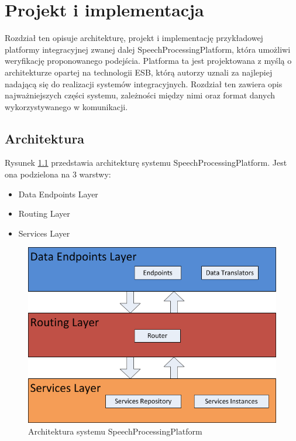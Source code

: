 
\chapter{Projekt i implementacja} %



\ifpdf
    \graphicspath{{6/figures/PNG/}{6/figures/PDF/}{6/figures/}}
\else
    \graphicspath{{6/figures/EPS/}{6/figures/}}
\fi


Rozdział ten opisuje architekturę, projekt i implementację przykładowej platformy integracyjnej zwanej dalej SpeechProcessingPlatform, która umożliwi weryfikację proponowanego podejścia. Platforma ta jest projektowana z myślą o architekturze opartej na technologii ESB, którą autorzy uznali za najlepiej nadającą się do realizacji systemów integracyjnych. Rozdział ten zawiera opis najważniejszych części systemu, zależności między nimi oraz format danych wykorzystywanego w komunikacji.

\section{Architektura}

Rysunek \ref{fig:layered_architecture} przedstawia architekturę systemu SpeechProcessingPlatform. Jest ona podzielona na 3 warstwy:

\begin{itemize}
	\item Data Endpoints Layer
	\item Routing Layer
	\item Services Layer
\end{itemize}

\begin{figure}[!h]
	\centering
	\includegraphics[scale=0.7]{layered_architecture.png}
	\caption{Architektura systemu SpeechProcessingPlatform}\label{fig:layered_architecture}
\end{figure}

